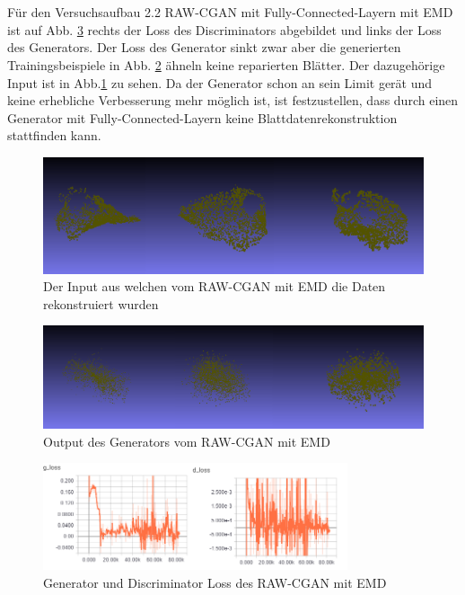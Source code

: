\documentclass{llncs}
\begin{document}
\newpage
~\\\\
Für den Versuchsaufbau 2.2 RAW-CGAN mit Fully-Connected-Layern mit EMD ist auf Abb. \ref{fig:Bild75} rechts der Loss des Discriminators abgebildet und links der Loss des Generators. Der Loss des Generator sinkt zwar aber die generierten Trainingsbeispiele in Abb. \ref{fig:Bild77} ähneln keine reparierten Blätter. Der dazugehörige Input ist in Abb.\ref{fig:Bild76} zu sehen. Da der Generator schon an sein Limit gerät und keine erhebliche Verbesserung mehr möglich ist, ist festzustellen, dass durch einen Generator mit Fully-Connected-Layern keine Blattdatenrekonstruktion stattfinden kann. 
\begin{figure}[htbp] 
	\centering
	\includegraphics[width=1.0\textwidth]{reaf_fully_connected_wgan_.png}
	\caption{Der Input aus welchen vom RAW-CGAN mit EMD die Daten rekonstruiert wurden}
	\label{fig:Bild76}
\end{figure}
\begin{figure}[htbp] 
	\centering
	\includegraphics[width=1.0\textwidth]{fake_wgan_fully_rawcgan.png}
	\caption{Output des Generators vom RAW-CGAN mit EMD}
	\label{fig:Bild77}
\end{figure}
\begin{figure}[htbp] 
	\centering
	\includegraphics[width=0.8\textwidth]{wasserstein_fully_connected_rawcgan_loss.png}
	\caption{Generator und Discriminator Loss des RAW-CGAN mit EMD}
	\label{fig:Bild75}
\end{figure}
\end{document}
